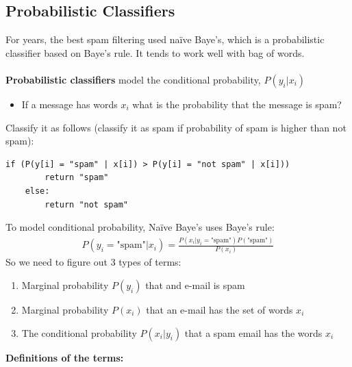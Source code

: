 \documentclass{article}
\theoremstyle{definition}
\begin{document}
\subsection*{Probabilistic Classifiers}
For years, the best spam filtering used naïve Baye's, which is a {\color{blue} probabilistic classifier} based on {\color{blue} Baye's rule}. It tends to {\color{blue} work well with bag of words}. \\ \\
\textbf{Probabilistic classifiers} model the conditional probability, $ P(y_i | x_i) $
\begin{itemize}[label=$ \cdot $]
	\item If a message has words $ x_i $ what is the probability that the message is spam?
\end{itemize}
Classify it as follows (classify it as spam if {\color{OliveGreen} probability of spam is higher than not spam}):
\begin{lstlisting}[tabsize=4]
	if (P(y[i] = "spam" | x[i]) > P(y[i] = "not spam" | x[i]))
		return "spam"
	else:
		return "not spam"
\end{lstlisting}
To model conditional probability, {\color{blue} Naïve Baye's} uses {\color{blue} Baye's rule}:
\begin{align*}
	P(y_i = \text{"spam"} | x_i) = \frac{P(x_i | y_i = \text{"spam"})P(\text{"spam"})}{P(x_i)}
\end{align*}
So we need to figure out 3 types of terms:
\begin{enumerate}
	\item {\color{blue} Marginal probability $ P(y_i) $} that and e-mail is spam
	\item {\color{blue} Marginal probability $ P(x_i) $} that an e-mail has the {\color{OliveGreen} set of words $ x_i $}
	\item {\color{blue} The conditional probability $ P(x_i | y_i) $} that {\color{OliveGreen} a spam email has the words $ x_i $}
\end{enumerate}
\textbf{Definitions of the terms:}
\end{document}
